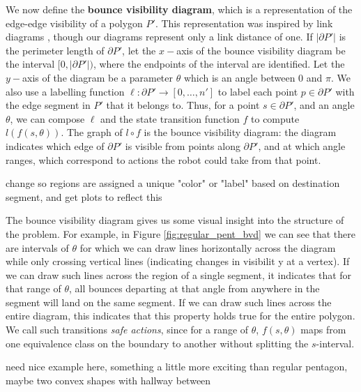 \documentclass[]{styles/svproc}  %
\begin{document}
We now define the \textbf{bounce visibility diagram}, which is a
representation of the edge-edge visibility of a polygon $P'$. This representation
was inspired by link diagrams \cite{efrat2000sweeping,tan_sweep}, though our
diagrams represent only a link distance of one.
If $|\partial P'|$ is the perimeter length of $\partial P'$, let the $x-$axis of the
bounce visibility diagram be the interval $[0, |\partial P'|)$, where the
endpoints of the interval are identified. Let the $y-$axis of the diagram be a
parameter $\theta$ which is an angle between $0$ and $\pi$.
We also use a labelling function $\ell: \partial P' \to [0, \ldots, n']$ to
label each point $p \in \partial P'$ with the edge segment in $P'$ that it
belongs to. Thus, for a point $s \in \partial P'$, and an angle $\theta$, we can
compose $\ell$ and the state transition function $f$ to compute
$l(f(s,\theta))$. The graph of $l \circ f$ is the bounce visibility diagram: 
the diagram indicates which edge
of $\partial P'$ is visible from points along $\partial P'$, and at which angle
ranges, which correspond to actions the robot could take from that point.

{\color{red} change so regions are assigned a unique "color" or "label" based on
destination segment, and get plots to reflect this}

The bounce visibility diagram gives us some visual insight into the structure of
the problem. For example, in Figure \ref{fig:regular_pent_bvd} we can see that
there are intervals of $\theta$ for which we can draw lines horizontally across
the diagram while only crossing vertical lines (indicating changes in visibilit
y at a vertex). If we can draw such lines across the region of a single
segment, it indicates that for that range of $\theta$, all bounces departing at
that angle from anywhere in the segment will land on the same segment. If we can
draw such lines across the entire diagram, this indicates that this property
holds true for the entire polygon. We call such transitions \emph{safe
actions}, since for a range of $\theta$, $f(s,\theta)$ maps from one equivalence
class on the boundary to another without splitting the $s$-interval.

{\color{red} need nice example here, something a little more exciting than
regular pentagon, maybe two convex shapes with hallway between}
\end{document}
